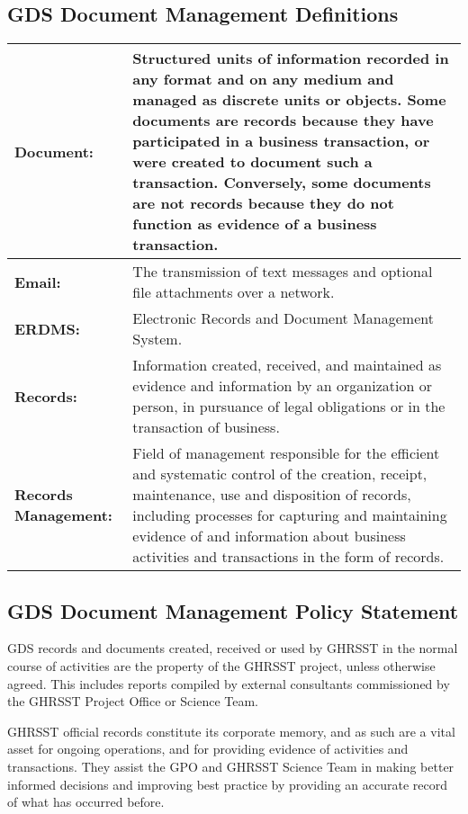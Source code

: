 \subsection{GDS Document Management Definitions}
\begin{longtable}{|p{}|p{}|}
    \label{tab:gds_document_definitions} \\
    \hline \endhead \hline \endfoot
    \textbf{Document: } & Structured units of information recorded in any
    format and on any medium and managed as discrete units or objects. Some documents are records because they have participated in a business transaction, or were created to document such a transaction. Conversely, some documents are not records because they do not function as evidence of a business transaction. \\ \hline
    \textbf{Email: } & The transmission of text messages and optional file attachments over a network. \\ \hline 
    \textbf{ERDMS: } & Electronic Records and Document Management System. \\ \hline 
    \textbf{Records:} & Information created, received, and maintained as evidence and information by an organization or person, in pursuance of legal obligations or in the transaction of business. \\ \hline
    \textbf{Records Management:} & Field of management responsible for the efficient and systematic control of the creation, receipt, maintenance, use and disposition of records, including processes for capturing and maintaining evidence of and information about business activities and transactions in the form of records.\\ 
\end{longtable}

\subsection{GDS Document Management Policy Statement}
GDS records and documents created, received or used by GHRSST in the normal course of activities
are the property of the GHRSST project, unless otherwise agreed. This includes reports compiled by
external consultants commissioned by the GHRSST Project Office or Science Team. 
\newp

GHRSST official records constitute its corporate memory, and as such are a vital asset for ongoing
operations, and for providing evidence of activities and transactions. They assist the GPO and GHRSST Science Team in making better informed decisions and improving best practice by providing an accurate record of what has occurred before.
\newp

